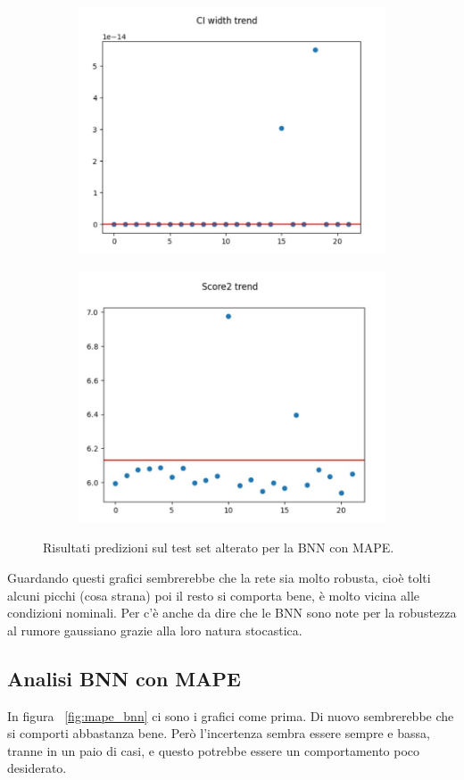 \documentclass[
	letterpaper,
	a4paper,
	cleardoublepage=empty,
	headings=twolinechapter,
	numbers=autoenddot,
]{article}
\begin{document}
\begin{figure}[h]
		\begin{subfigure}{.5\textwidth}
			\centering
			\includegraphics[width=0.7\linewidth]{ImageFiles/mae_bnn_ci}
			\caption{}
				\label{fig:mae_bnn_ci}
		\end{subfigure}%
		\begin{subfigure}{.5\textwidth}
			\centering
			\includegraphics[width=0.7\linewidth]{ImageFiles/mae_bnn_eff2}
			\caption{}
			\label{fig:mae_bnn_eff2}
		\end{subfigure}
		\caption{Risultati predizioni sul test set alterato per la BNN con MAPE.}
		\label{fig:mae_bnn}
	\end{figure}

	Guardando questi grafici sembrerebbe che la rete sia molto robusta, cioè tolti alcuni picchi (cosa strana) poi il resto si comporta bene, è molto vicina alle condizioni nominali. Per c'è anche da dire che le BNN sono note per la robustezza al rumore gaussiano grazie alla loro natura stocastica.
	
	\subsection{Analisi BNN con MAPE}
	In figura ~\ref{fig:mape_bnn} ci sono i grafici come prima. Di nuovo sembrerebbe che si comporti abbastanza bene. Però l'incertenza sembra essere sempre e bassa, tranne in un paio di casi, e questo potrebbe essere un comportamento poco desiderato.
	
\end{document}
